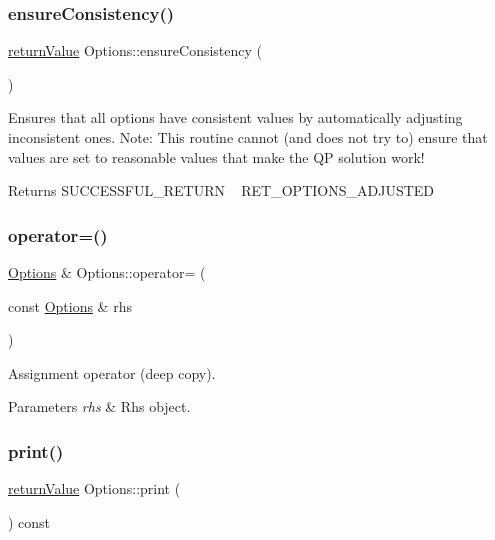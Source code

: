 \subsubsection{\texorpdfstring{ensure\+Consistency()}{ensureConsistency()}}
{\footnotesize\ttfamily \hyperlink{_message_handling_8hpp_a81d556f613bfbabd0b1f9488c0fa865e}{return\+Value} Options\+::ensure\+Consistency (\begin{DoxyParamCaption}{ }\end{DoxyParamCaption})}

Ensures that all options have consistent values by automatically adjusting inconsistent ones. Note\+: This routine cannot (and does not try to) ensure that values are set to reasonable values that make the QP solution work! \begin{DoxyReturn}{Returns}
S\+U\+C\+C\+E\+S\+S\+F\+U\+L\+\_\+\+R\+E\+T\+U\+RN ~\newline
 R\+E\+T\+\_\+\+O\+P\+T\+I\+O\+N\+S\+\_\+\+A\+D\+J\+U\+S\+T\+ED 
\end{DoxyReturn}
\mbox{\label{class_options_a58a8fea98a7e4c83e6692084e4227fa8}} 
\subsubsection{\texorpdfstring{operator=()}{operator=()}}
{\footnotesize\ttfamily \hyperlink{class_options}{Options} \& Options\+::operator= (\begin{DoxyParamCaption}\item[{const \hyperlink{class_options}{Options} \&}]{rhs }\end{DoxyParamCaption})}

Assignment operator (deep copy). 
\begin{DoxyParams}{Parameters}
{\em rhs} & Rhs object. \\
\hline
\end{DoxyParams}
\mbox{\label{class_options_afc24e794f0871176e811de2671259374}} 
\subsubsection{\texorpdfstring{print()}{print()}}
{\footnotesize\ttfamily \hyperlink{_message_handling_8hpp_a81d556f613bfbabd0b1f9488c0fa865e}{return\+Value} Options\+::print (\begin{DoxyParamCaption}{ }\end{DoxyParamCaption}) const}

